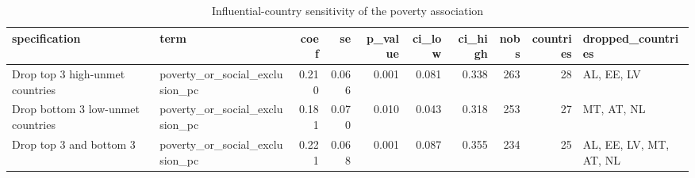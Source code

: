 \begin{table}
\caption{Influential-country sensitivity of the poverty association}
\label{tab:regression_sensitivity_influential}
\begin{tabular}{llrrrrrrrl}
\toprule
specification & term & coef & se & p\_value & ci\_low & ci\_high & nobs & countries & dropped\_countries \\
\midrule
Drop top 3 high-unmet countries & poverty\_or\_social\_exclusion\_pc & 0.210 & 0.066 & 0.001 & 0.081 & 0.338 & 263 & 28 & AL, EE, LV \\
Drop bottom 3 low-unmet countries & poverty\_or\_social\_exclusion\_pc & 0.181 & 0.070 & 0.010 & 0.043 & 0.318 & 253 & 27 & MT, AT, NL \\
Drop top 3 and bottom 3 & poverty\_or\_social\_exclusion\_pc & 0.221 & 0.068 & 0.001 & 0.087 & 0.355 & 234 & 25 & AL, EE, LV, MT, AT, NL \\
\bottomrule
\end{tabular}
\end{table}
